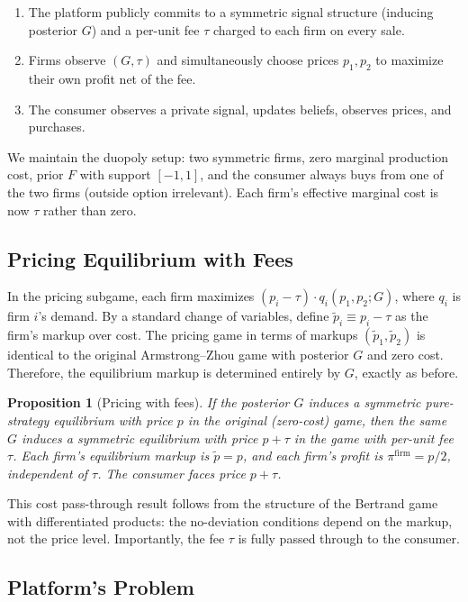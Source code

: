\documentclass[12pt, a4paper]{article}
\newtheorem{proposition}{Proposition}
\begin{document}
\begin{enumerate}[nosep]
    \item The platform publicly commits to a symmetric signal structure (inducing posterior $G$) and a per-unit fee $\tau$ charged to each firm on every sale.
    \item Firms observe $(G, \tau)$ and simultaneously choose prices $p_1, p_2$ to maximize their own profit net of the fee.
    \item The consumer observes a private signal, updates beliefs, observes prices, and purchases.
\end{enumerate}

We maintain the duopoly setup: two symmetric firms, zero marginal production cost, prior $F$ with support $[-1,1]$, and the consumer always buys from one of the two firms (outside option irrelevant). Each firm's effective marginal cost is now $\tau$ rather than zero.

\subsection{Pricing Equilibrium with Fees}

In the pricing subgame, each firm maximizes $(p_i - \tau) \cdot q_i(p_1, p_2; G)$, where $q_i$ is firm $i$'s demand. By a standard change of variables, define $\tilde{p}_i \equiv p_i - \tau$ as the firm's markup over cost. The pricing game in terms of markups $(\tilde{p}_1, \tilde{p}_2)$ is identical to the original Armstrong--Zhou game with posterior $G$ and zero cost. Therefore, the equilibrium markup is determined entirely by $G$, exactly as before.

\begin{proposition}[Pricing with fees]
If the posterior $G$ induces a symmetric pure-strategy equilibrium with price $p$ in the original (zero-cost) game, then the same $G$ induces a symmetric equilibrium with price $p + \tau$ in the game with per-unit fee $\tau$. Each firm's equilibrium markup is $\tilde{p} = p$, and each firm's profit is $\pi^{\text{firm}} = p/2$, independent of $\tau$. The consumer faces price $p + \tau$.
\end{proposition}

This cost pass-through result follows from the structure of the Bertrand game with differentiated products: the no-deviation conditions depend on the markup, not the price level. Importantly, the fee $\tau$ is fully passed through to the consumer.

\subsection{Platform's Problem}
\end{document}
